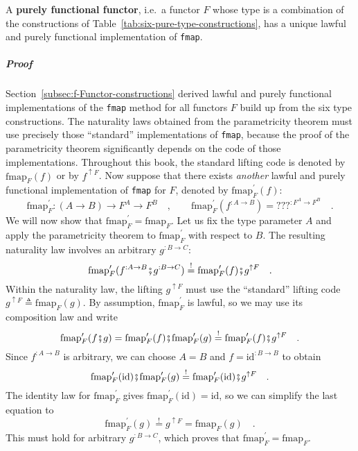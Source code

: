 A \textbf{purely functional functor},
i.e.~a functor $F$ whose type is a combination of the constructions
of Table~\ref{tab:six-pure-type-constructions}, has a unique lawful
and purely functional implementation of \lstinline!fmap!. 

\subparagraph{Proof}

Section~\ref{subsec:f-Functor-constructions} derived lawful and
purely functional implementations of the \lstinline!fmap! method
for all functors $F$ build up from the six type constructions. The
naturality laws obtained from the parametricity theorem must use precisely
those ``standard'' implementations of \lstinline!fmap!, because
the proof of the parametricity theorem significantly depends on the
code of those implementations. Throughout this book, the standard
lifting code is denoted by $\text{fmap}_{F}(f)$ or by $f^{\uparrow F}$.
Now suppose that there exists \emph{another} lawful and purely functional
implementation of \lstinline!fmap! for $F$, denoted by $\text{fmap}_{F}^{\prime}(f)$:
\[
\text{fmap}_{F}^{\prime}:\left(A\rightarrow B\right)\rightarrow F^{A}\rightarrow F^{B}\quad,\quad\quad\text{fmap}_{F}^{\prime}(f^{:A\rightarrow B})=\text{???}^{:F^{A}\rightarrow F^{B}}\quad.
\]
We will now show that $\text{fmap}_{F}^{\prime}=\text{fmap}_{F}$.
Let us fix the type parameter $A$ and apply the parametricity theorem
to $\text{fmap}_{F}^{\prime}$ with respect to $B$. The resulting
naturality law involves an arbitrary $g^{:B\rightarrow C}$:
\[
\text{fmap}_{F}^{\prime}(f^{:A\rightarrow B}\bef g^{:B\rightarrow C})\overset{!}{=}\text{fmap}_{F}^{\prime}(f)\bef g^{\uparrow F}\quad.
\]
Within the naturality law, the lifting $g^{\uparrow F}$ must use
the ``standard'' lifting code $g^{\uparrow F}\triangleq\text{fmap}_{F}(g)$.
By assumption, $\text{fmap}_{F}^{\prime}$ is lawful, so we may use
its composition law and write
\[
\text{fmap}_{F}^{\prime}(f\bef g)=\text{fmap}_{F}^{\prime}(f)\bef\text{fmap}_{F}^{\prime}(g)\overset{!}{=}\text{fmap}_{F}^{\prime}(f)\bef g^{\uparrow F}\quad.
\]
Since $f^{:A\rightarrow B}$ is arbitrary, we can choose $A=B$ and
$f=\text{id}^{:B\rightarrow B}$ to obtain
\[
\text{fmap}_{F}^{\prime}(\text{id})\bef\text{fmap}_{F}^{\prime}(g)\overset{!}{=}\text{fmap}_{F}^{\prime}(\text{id})\bef g^{\uparrow F}\quad.
\]
The identity law for $\text{fmap}_{F}^{\prime}$ gives $\text{fmap}_{F}^{\prime}(\text{id})=\text{id}$,
so we can simplify the last equation to
\[
\text{fmap}_{F}^{\prime}(g)\overset{!}{=}g^{\uparrow F}=\text{fmap}_{F}(g)\quad.
\]
This must hold for arbitrary $g^{:B\rightarrow C}$, which proves
that $\text{fmap}_{F}^{\prime}=\text{fmap}_{F}$.

